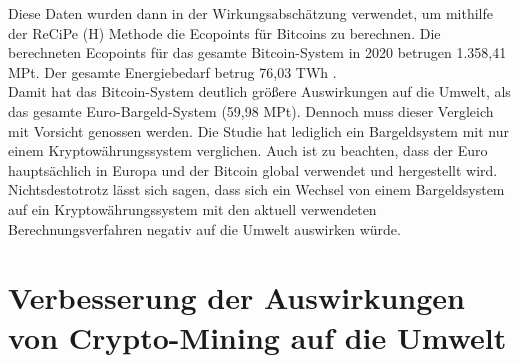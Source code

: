 \documentclass[12pt]{article}
\begin{document}
\FloatBarrier
\noindent Diese Daten wurden dann in der Wirkungsabschätzung verwendet, um mithilfe der ReCiPe (H) Methode die Ecopoints für Bitcoins zu berechnen. Die berechneten Ecopoints für das gesamte Bitcoin-System in 2020 betrugen 1.358,41 MPt. Der gesamte Energiebedarf betrug 76,03 TWh .\\
Damit hat das Bitcoin-System deutlich größere Auswirkungen auf die Umwelt, als das gesamte Euro-Bargeld-System (59,98 MPt). Dennoch muss dieser Vergleich mit Vorsicht genossen werden. Die Studie hat lediglich ein Bargeldsystem mit nur einem Kryptowährungssystem verglichen. Auch ist zu beachten, dass der Euro hauptsächlich in Europa und der Bitcoin global verwendet und hergestellt wird. Nichtsdestotrotz lässt sich sagen, dass sich ein Wechsel von einem Bargeldsystem auf ein Kryptowährungssystem mit den aktuell verwendeten Berechnungsverfahren negativ auf die Umwelt auswirken würde.

\part{Verbesserung der Auswirkungen von Crypto-Mining auf die Umwelt}
\end{document}
